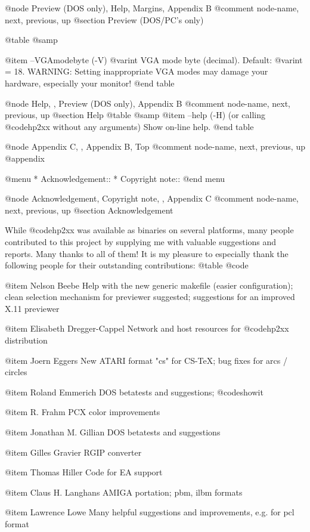 @node Preview (DOS only), Help, Margins, Appendix B
@comment  node-name,  next,  previous,  up
@section  Preview (DOS/PC's only)

@table @samp

@item --VGAmodebyte (-V) @var{int}
VGA mode byte (decimal). Default: @var{int} = 18.
WARNING: Setting inappropriate VGA modes may damage your hardware,
especially your monitor!
@end table


@node Help, , Preview (DOS only), Appendix B
@comment  node-name,  next,  previous,  up
@section  Help
@table @samp
@item --help (-H)
(or calling @code{hp2xx} without any arguments)  Show on-line help.
@end table



@node Appendix C, , Appendix B, Top
@comment  node-name,  next,  previous,  up
@appendix

@menu
* Acknowledgement::
* Copyright note::
@end menu


@node Acknowledgement, Copyright note, , Appendix C
@comment  node-name,  next,  previous,  up
@section Acknowledgement

While @code{hp2xx} was available as binaries on several platforms,
many people contributed to this project by supplying me with
valuable suggestions and reports. Many thanks to all of them!
It is my pleasure to especially thank the following people for their
outstanding contributions:
@table @code

@item Nelson Beebe
Help with the new generic makefile (easier configuration);
clean selection mechanism for previewer suggested;
suggestions for an improved X.11 previewer

@item Elisabeth Dregger-Cappel
Network and host resources for @code{hp2xx} distribution

@item Joern Eggers
New ATARI format "cs" for CS-TeX; bug fixes for arcs / circles

@item Roland Emmerich
DOS betatests and suggestions; @code{showit}

@item R. Frahm
PCX color improvements

@item Jonathan M. Gillian
DOS betatests and suggestions

@item Gilles Gravier
RGIP converter

@item Thomas Hiller
Code for EA support

@item Claus H. Langhans
AMIGA portation; pbm, ilbm formats

@item Lawrence Lowe
Many helpful suggestions and improvements, e.g. for pcl format

